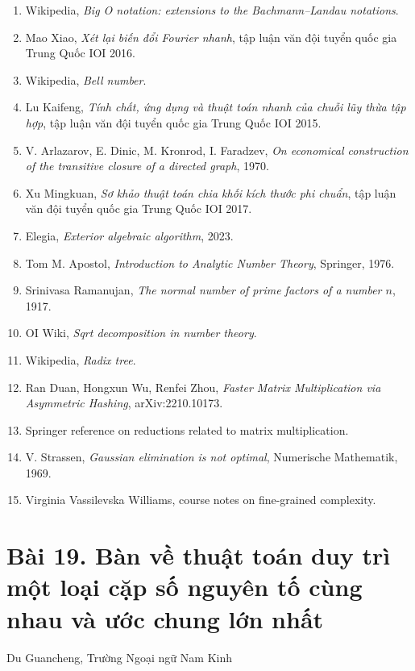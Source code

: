 \documentclass[11pt]{article}
\begin{document}
\begin{enumerate}
\item Wikipedia, \emph{Big O notation: extensions to the Bachmann--Landau notations}.
\item Mao Xiao, \emph{Xét lại biến đổi Fourier nhanh}, tập luận văn đội tuyển
quốc gia Trung Quốc IOI 2016.
\item Wikipedia, \emph{Bell number}.
\item Lu Kaifeng, \emph{Tính chất, ứng dụng và thuật toán nhanh của chuỗi lũy
thừa tập hợp}, tập luận văn đội tuyển quốc gia Trung Quốc IOI 2015.
\item V. Arlazarov, E. Dinic, M. Kronrod, I. Faradzev, \emph{On economical
construction of the transitive closure of a directed graph}, 1970.
\item Xu Mingkuan, \emph{Sơ khảo thuật toán chia khối kích thước phi chuẩn},
tập luận văn đội tuyển quốc gia Trung Quốc IOI 2017.
\item Elegia, \emph{Exterior algebraic algorithm}, 2023.
\item Tom M. Apostol, \emph{Introduction to Analytic Number Theory}, Springer,
1976.
\item Srinivasa Ramanujan, \emph{The normal number of prime factors of a number
\(n\)}, 1917.
\item OI Wiki, \emph{Sqrt decomposition in number theory}.
\item Wikipedia, \emph{Radix tree}.
\item Ran Duan, Hongxun Wu, Renfei Zhou, \emph{Faster Matrix Multiplication via
Asymmetric Hashing}, arXiv:2210.10173.
\item Springer reference on reductions related to matrix multiplication.
\item V. Strassen, \emph{Gaussian elimination is not optimal}, Numerische
Mathematik, 1969.
\item Virginia Vassilevska Williams, course notes on fine-grained complexity.
\end{enumerate}

\section*{Bài 19. Bàn về thuật toán duy trì một loại cặp số nguyên tố cùng nhau và ước chung lớn nhất}

\begin{center}
Du Guancheng, Trường Ngoại ngữ Nam Kinh
\end{center}
\end{document}
